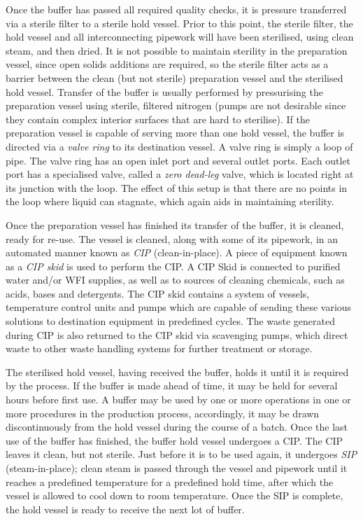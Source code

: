 Once the buffer has passed all required quality checks, it is pressure
transferred via a sterile filter to a sterile hold vessel.
Prior to this point, the sterile filter, the hold vessel and all
interconnecting pipework will have been sterilised, using clean steam, and then
dried.  
It is not possible to maintain sterility in the preparation vessel,
since open solids additions are required, so the sterile filter acts as a
barrier between the clean (but not sterile) preparation vessel and the
sterilised hold vessel.
Transfer of the buffer is usually performed by pressurising the preparation
vessel using sterile, filtered nitrogen (pumps are not desirable since they
contain complex interior surfaces that are hard to sterilise).
If the preparation vessel is capable of serving more than one hold vessel, the
buffer is directed via a \emph{valve ring} to its destination vessel.
A valve ring is simply a loop of pipe.
The valve ring has an open inlet port and several outlet ports.
Each outlet port has a specialised valve, called a \emph{zero dead-leg} valve,
which is located right at its junction with the loop.
The effect of this setup is that there are no points in the loop where liquid
can stagnate, which again aids in maintaining sterility.

Once the preparation vessel has finished its transfer of the buffer, it is
cleaned, ready for re-use.
The vessel is cleaned, along with some of its pipework, in an automated manner
known as \emph{CIP} (clean-in-place).
A piece of equipment known as a \emph{CIP skid} is used to perform the CIP.
A CIP Skid is connected to purified water and/or WFI supplies, as well as
to sources of cleaning chemicals, such as acids, bases and detergents.
The CIP skid contains a system of vessels, temperature control units and pumps
which are capable of sending these various solutions to destination equipment
in predefined cycles.  The waste generated during CIP is also returned to the
CIP skid via scavenging pumps, which direct waste to other waste handling
systems for further treatment or storage.

The sterilised hold vessel, having received the buffer, holds it until it is
required by the process.
If the buffer is made ahead of time, it may be held for several hours before
first use.
A buffer may be used by one or more operations in one or more procedures in the
production process, accordingly, it may be drawn discontinuously from the hold
vessel during the course of a batch.
Once the last use of the buffer has finished, the buffer hold vessel undergoes
a CIP.
The CIP leaves it clean, but not sterile.
Just before it is to be used again, it undergoes \emph{SIP} (steam-in-place);
clean steam is passed through the vessel and pipework until it reaches a
predefined temperature for a predefined hold time, after which the vessel is
allowed to cool down to room temperature.
Once the SIP is complete, the hold vessel is ready to receive the next lot of
buffer.

